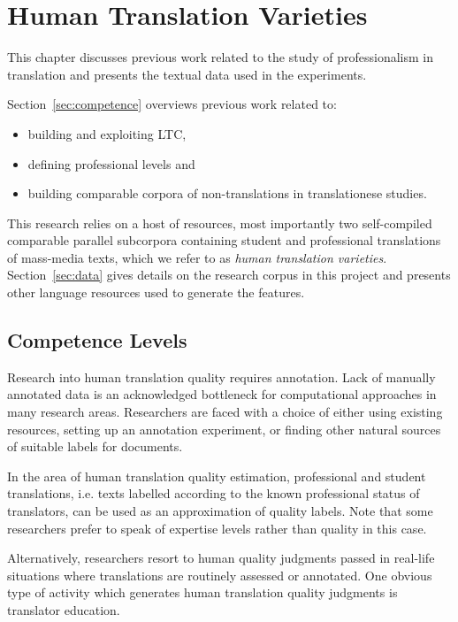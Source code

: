 \chapter{\label{cha:varieties}Human Translation Varieties}
This chapter discusses previous work related to the study of professionalism in translation and presents the textual data used in the experiments.  

Section~\ref{sec:competence} overviews previous work related to:
\begin{itemize}\compresslist{}
	\item building and exploiting \gls{LTC},
	\item defining professional levels and
	\item building comparable corpora of non-translations in translationese studies.
\end{itemize}

This research relies on a host of resources, most importantly two self-compiled comparable parallel subcorpora containing student and professional translations of mass-media texts, which we refer to as \textit{human translation varieties}. 
Section~\ref{sec:data} gives details on the research corpus in this project and presents other language resources used to generate the features.

\section{\label{sec:competence}Competence Levels}

Research into human translation quality requires annotation. Lack of manually annotated data is an acknowledged bottleneck for computational approaches in many research areas. Researchers are faced with a choice of either using existing resources, setting up an annotation experiment, or finding other natural sources of suitable labels for documents. 

In the area of human translation quality estimation, professional and student translations, i.e. texts labelled according to the known professional status of translators, can be used as an approximation of quality labels. Note that some researchers prefer to speak of expertise levels rather than quality in this case. 

Alternatively, researchers resort to human quality judgments passed in real-life situations where translations are routinely assessed or annotated. One obvious type of activity which generates human translation quality judgments is translator education. 

